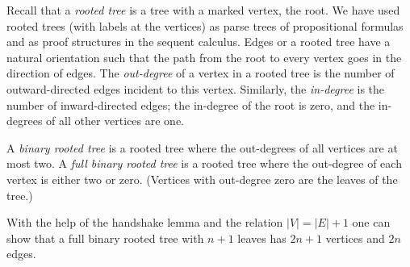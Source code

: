 

\setcounter{section}{4}
\setcounter{subsection}{1}
\setcounter{dfn}{0}

Recall that a \emph{rooted tree} is a tree with a marked vertex, the root.
We have used rooted trees (with labels at the vertices) as parse trees of propositional formulas
and as proof structures in the sequent calculus.
Edges or a rooted tree have a natural orientation such that the path from the root to every vertex goes in the direction of edges.
The \emph{out-degree} of a vertex in a rooted tree is the number of outward-directed edges incident to this vertex.
Similarly, the \emph{in-degree} is the number of inward-directed edges; the in-degree of the root is zero, and the in-degrees of all other vertices are one.

A \emph{binary rooted tree} is a rooted tree where the out-degrees of all vertices are at most two.
A \emph{full binary rooted tree} is a rooted tree where the out-degree of each vertex is either two or zero.
(Vertices with out-degree zero are the leaves of the tree.)

With the help of the handshake lemma and the relation $|V| = |E| + 1$ one can show that
a full binary rooted tree with $n+1$ leaves has $2n+1$ vertices and $2n$ edges.



